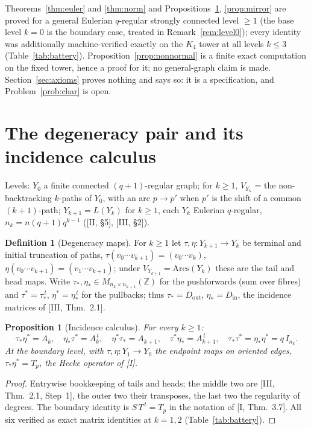 \documentclass[11pt]{amsart}
\numberwithin{equation}{section}
\newtheorem{proposition}[theorem]{Proposition}
\theoremstyle{definition}
\newtheorem{definition}[theorem]{Definition}
\theoremstyle{remark}
\newcommand{\Z}{\mathbb{Z}}
\newcommand{\ta}{\tau_*}
\newcommand{\taup}{\tau^*}
\newcommand{\et}{\eta_*}
\newcommand{\etp}{\eta^*}
\begin{document}
Theorems~\ref{thm:euler} and \ref{thm:norm} and Propositions~\ref{prop:calculus},
\ref{prop:mirror} are proved for a general Eulerian $q$-regular strongly connected
level $\ge1$ (the base level $k=0$ is the boundary case, treated in
Remark~\ref{rem:level0}); every identity was additionally machine-verified exactly on
the $K_4$ tower at all levels $k\le3$ (Table~\ref{tab:battery}).
Proposition~\ref{prop:nonnormal} is a finite exact computation on the fixed tower,
hence a proof for it; no general-graph claim is made. Section~\ref{sec:axioms} proves
nothing and says so: it is a specification, and Problem~\ref{prob:char} is open.

\section{The degeneracy pair and its incidence calculus}\label{sec:calculus}

Levels: $Y_0$ a finite connected $(q+1)$-regular graph; for $k\ge1$, $V_{Y_k}$ = the
non-backtracking $k$-paths of $Y_0$, with an arc $p\to p'$ when $p'$ is the shift of a
common $(k{+}1)$-path; $Y_{k+1}=L(Y_k)$ for $k\ge1$, each $Y_k$ Eulerian $q$-regular,
$n_k=n(q+1)q^{k-1}$ ([II, \S5], [III, \S2]).

\begin{definition}[Degeneracy maps]\label{def:degen}
For $k\ge1$ let $\tau,\eta\colon Y_{k+1}\to Y_k$ be terminal and initial truncation of
paths, $\tau(v_0\cdots v_{k+1})=(v_0\cdots v_k)$, $\eta(v_0\cdots v_{k+1})
=(v_1\cdots v_{k+1})$; under $V_{Y_{k+1}}=\mathrm{Arcs}(Y_k)$ these are the tail and
head maps. Write $\ta,\et\in M_{n_k\times n_{k+1}}(\Z)$ for the pushforwards (sum over
fibres) and $\taup=\ta^{\,t}$, $\etp=\et^{\,t}$ for the pullbacks; thus
$\ta=D_{\mathrm{out}}$, $\et=D_{\mathrm{in}}$, the incidence matrices of
[III, Thm.~2.1].
\end{definition}

\begin{proposition}[Incidence calculus]\label{prop:calculus}
For every $k\ge1$:
\[
\ta\etp=A_k,\quad \et\taup=A_k^{\,t},\quad \etp\ta=A_{k+1},\quad \taup\et=A_{k+1}^{\,t},
\quad \ta\taup=\et\etp=q\,I_{n_k}.
\]
At the boundary level, with $\tau,\eta\colon Y_1\to Y_0$ the endpoint maps on oriented
edges, $\ta\etp=T_p$, the Hecke operator of {\rm[I]}.
\end{proposition}

\begin{proof}
Entrywise bookkeeping of tails and heads; the middle two are [III, Thm.~2.1, Step~1],
the outer two their transposes, the last two the regularity of degrees. The boundary
identity is $S\,T^{\,t}=T_p$ in the notation of [I, Thm.~3.7]. All six verified as
exact matrix identities at $k=1,2$ (Table~\ref{tab:battery}).
\end{proof}
\end{document}
